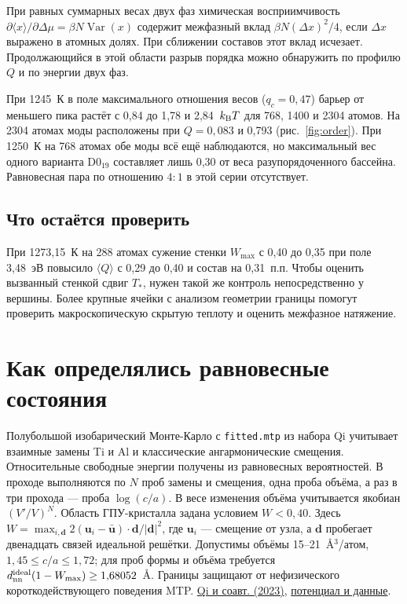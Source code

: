\documentclass[11pt,a4paper]{article}
\begin{document}
\label{fig:eqbarrier}

При равных суммарных весах двух фаз химическая восприимчивость \(\partial\langle x\rangle/\partial\Delta\mu=\beta N\operatorname{Var}(x)\) содержит межфазный вклад \(\beta N(\Delta x)^2/4\), если \(\Delta x\) выражено в атомных долях. При сближении составов этот вклад исчезает. Продолжающийся в этой области разрыв порядка можно обнаружить по профилю \(Q\) и по энергии двух фаз.

При 1245~К в поле максимального отношения весов (\(q_c=0{,}47\)) барьер от меньшего пика растёт с 0,84 до 1,78 и 2,84~\(k_{\rm B}T\) для 768, 1400 и 2304 атомов. На 2304 атомах моды расположены при \(Q=0{,}083\) и 0,793 (рис.~\ref{fig:order}). При 1250~К на 768 атомах обе моды всё ещё наблюдаются, но максимальный вес одного варианта D0$_{19}$ составляет лишь 0,30 от веса разупорядоченного бассейна. Равновесная пара по отношению \(4:1\) в этой серии отсутствует.
\subsection*{Что остаётся проверить}
При 1273,15~К на 288 атомах сужение стенки \(W_{\max}\) с 0,40 до 0,35 при поле 3,48~эВ повысило \(\langle Q\rangle\) с 0,29 до 0,40 и состав на 0,31~п.п. Чтобы оценить вызванный стенкой сдвиг \(T_*\), нужен такой же контроль непосредственно у вершины. Более крупные ячейки с анализом геометрии границы помогут проверить макроскопическую скрытую теплоту и оценить межфазное натяжение.
\clearpage
\section*{Как определялись равновесные состояния}
Полубольшой изобарический Монте-Карло с \texttt{fitted.mtp} из набора Qi учитывает взаимные замены Ti и Al и классические ангармонические смещения. Относительные свободные энергии получены из равновесных вероятностей. В проходе выполняются по \(N\) проб замены и смещения, одна проба объёма, а раз в три прохода --- проба \(\log(c/a)\). В весе изменения объёма учитывается якобиан \((V'/V)^N\). Область ГПУ-кристалла задана условием \(W<0{,}40\). Здесь \(W=\max_{i,\mathbf d}2(\mathbf u_i-\bar{\mathbf u})\cdot\mathbf d/|\mathbf d|^2\), где \(\mathbf u_i\) --- смещение от узла, а \(\mathbf d\) пробегает двенадцать связей идеальной решётки. Допустимы объёмы 15--21~\AA$^3$/атом, \(1{,}45\le c/a\le1{,}72\); для проб формы и объёма требуется \(d_{\rm nn}^{\rm ideal}(1-W_{\max})\ge1{,}68052\)~\AA. Границы защищают от нефизического короткодействующего поведения MTP. \href{https://doi.org/10.1103/PhysRevMaterials.7.103602}{Qi и соавт. (2023)}, \href{https://doi.org/10.6084/m9.figshare.24079611}{потенциал и данные}.
\end{document}
